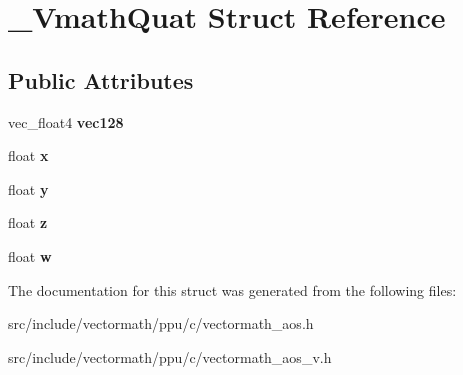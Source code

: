 \hypertarget{struct__VmathQuat}{\section{\-\_\-\-Vmath\-Quat Struct Reference}
\label{struct__VmathQuat}
}
\subsection*{Public Attributes}
\begin{DoxyCompactItemize}
\item 
\hypertarget{struct__VmathQuat_a67806d6661eecf4c56ca8a3717515c4e}{vec\-\_\-float4 {\bfseries vec128}}\label{struct__VmathQuat_a67806d6661eecf4c56ca8a3717515c4e}

\item 
\hypertarget{struct__VmathQuat_a2dbcad27831e4ea04031e85bd9b60c62}{float {\bfseries x}}\label{struct__VmathQuat_a2dbcad27831e4ea04031e85bd9b60c62}

\item 
\hypertarget{struct__VmathQuat_a70a9b3343881694bcc663be94bdbe843}{float {\bfseries y}}\label{struct__VmathQuat_a70a9b3343881694bcc663be94bdbe843}

\item 
\hypertarget{struct__VmathQuat_a2a428878fe92f133093a3ec1ed2ba6ec}{float {\bfseries z}}\label{struct__VmathQuat_a2a428878fe92f133093a3ec1ed2ba6ec}

\item 
\hypertarget{struct__VmathQuat_a537175284e6b24b3c731d9e3b7cb2b47}{float {\bfseries w}}\label{struct__VmathQuat_a537175284e6b24b3c731d9e3b7cb2b47}

\end{DoxyCompactItemize}


The documentation for this struct was generated from the following files\-:\begin{DoxyCompactItemize}
\item 
src/include/vectormath/ppu/c/vectormath\-\_\-aos.\-h\item 
src/include/vectormath/ppu/c/vectormath\-\_\-aos\-\_\-v.\-h\end{DoxyCompactItemize}
